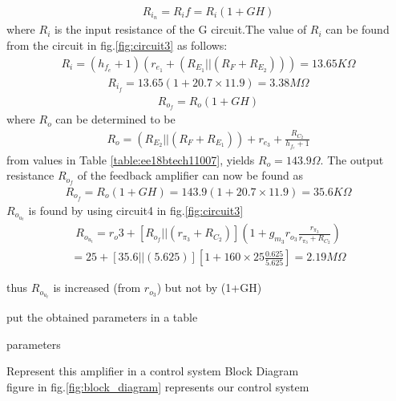 \begin{enumerate}[label=\thesubsection.\arabic*.,ref=\thesubsection.\theenumi]
{\\
\solution
\begin{align}
    R_i_n =R_if=R_i(1+GH)
\end{align}
where $R_i$ is the input resistance of the G circuit.The value of $R_i$ can be found from the circuit in fig.\ref{fig:circuit3} as follows:
\begin{align}
    R_i=(h_f_e+1)(r_e_1+(R_E_1||(R_F+R_E_2)))=13.65K\Omega
\end{align} 
\begin{align}
    R_i_f=13.65(1+20.7\times11.9)=3.38M\Omega
\end{align}
\begin{align}
    R_o_f=R_o(1+GH)
\end{align}
where $R_o$ can be determined to be 
 \begin{align}
    R_o=(R_E_2||(R_F+R_E_1))+r_e_3+\frac{R_C_2}{h_f_e+1}
\end{align}
from values in Table \ref{table:ee18btech11007}, yields $R_o = 143.9 \Omega$. The output resistance $R_o_f$ of the feedback amplifier can now be found as
\begin{align}
    R_o_f=R_o(1+GH)=143.9(1+20.7\times11.9)=35.6K\Omega
\end{align}
$R_o_u_t$ is found by using circuit4 in fig.\ref{fig:circuit3}
\begin{align}
    R_o_u_t=r_o3+[R_o_f||(r_\pi_3+R_C_2)](1+g_m_3r_o_3\frac{r_\pi_3}{r_\pi_3+R_C_2})
\end{align}
\begin{align}
=25+[35.6||(5.625)][1+160\times25\frac{0.625}{5.625}]=2.19M\Omega \end{align}

thus $R_o_u_t$ is increased (from $r_o_3$) but not by (1+GH)
\item put the obtained parameters in a table
\\
\solution 
\begin{table}[!ht]
\centering

\caption{parameters}
\label{table:parameters}
\end{table}
\item Represent this amplifier in  a control system Block Diagram
\\
\solution figure in  fig.\ref{fig:block_diagram} represents our control system
\begin{figure}[!ht]
	\begin{center}
		

\end{center}
\end{figure}}
\end{enumerate}
